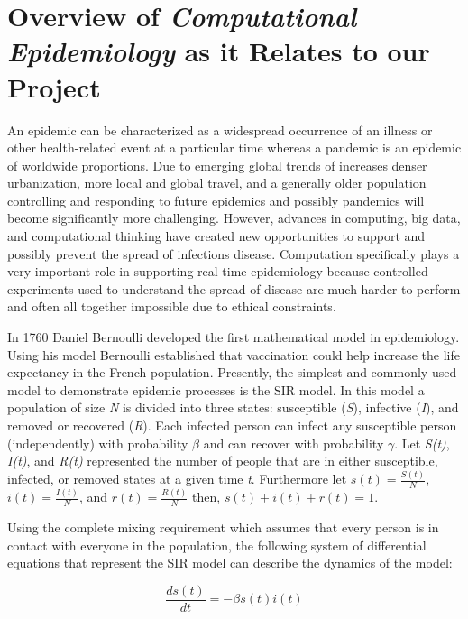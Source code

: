 \documentclass[12pt, oneside, openany]{article} %
\begin{document}

\tableofcontents
\newpage

\section{Overview of \textit{Computational Epidemiology} as it Relates to our Project}
An epidemic can be characterized as a widespread occurrence of an illness or other health-related event at a particular time whereas a pandemic is an epidemic of worldwide proportions. Due to emerging global trends of increases denser urbanization, more local and global travel, and a generally older population controlling and responding to future epidemics and possibly pandemics will become significantly more challenging. However, advances in computing, big data, and computational thinking have created new opportunities to support and possibly prevent the spread of infections disease. Computation specifically plays a very important role in supporting real-time epidemiology because controlled experiments used to understand the spread of disease are much harder to perform and often all together impossible due to ethical constraints. 

In 1760 Daniel Bernoulli developed the first mathematical model in epidemiology. Using his model Bernoulli established that vaccination could help increase the life expectancy in the French population. Presently, the simplest and commonly used model to demonstrate epidemic processes is the SIR model. In this model a population of size \textit{N} is divided into three states: susceptible (\textit{S}), infective (\textit{I}), and removed or recovered (\textit{R}). Each infected person can infect any susceptible person (independently) with probability \( \beta\) and can recover with probability \(\gamma\). Let \textit{S(t)}, \textit{I(t)}, and \textit{R(t)} represented the number of people that are in either susceptible, infected, or removed states at a given time \textit{t}. Furthermore let \( s(t) = \frac{S(t)}{N} \), \( i(t) = \frac{I(t)}{N} \), and \( r(t) = \frac{R(t)}{N} \) then, \( s(t) + i(t) + r(t) = 1 \). 

Using the complete mixing requirement which assumes that every person is in contact with everyone in the population, the following system of differential equations that represent the SIR model can describe the dynamics of the model:

\begin{equation}
	\frac{ds(t)}{dt} = - \beta s(t) i(t)
\end{equation}
\end{document}
